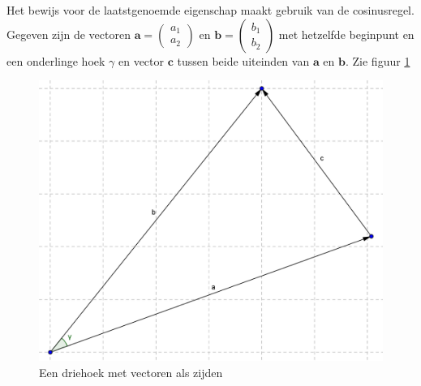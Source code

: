 \documentclass[12pt,a4paper]{article}
\begin{document}
	Het bewijs voor de laatstgenoemde eigenschap maakt gebruik van de cosinusregel. Gegeven zijn de vectoren $\mathbf{a}=\begin{pmatrix} a_1 \\ a_2 \end{pmatrix}$ en $\mathbf{b}=\begin{pmatrix} b_1 \\ b_2 \end{pmatrix}$ met hetzelfde beginpunt en een onderlinge hoek $\gamma$ en vector $\mathbf{c}$ tussen beide uiteinden van $\mathbf{a}$ en $\mathbf{b}$. Zie figuur \ref{cosinusregel-inproduct}
	
	\begin{figure}[h]
		\centerline{\includegraphics[width=\textwidth]{Plaatjes/cosinusregel-inproduct.png}}
		\caption{Een driehoek met vectoren als zijden}
		\label{cosinusregel-inproduct}
	\end{figure}
	
\end{document}
